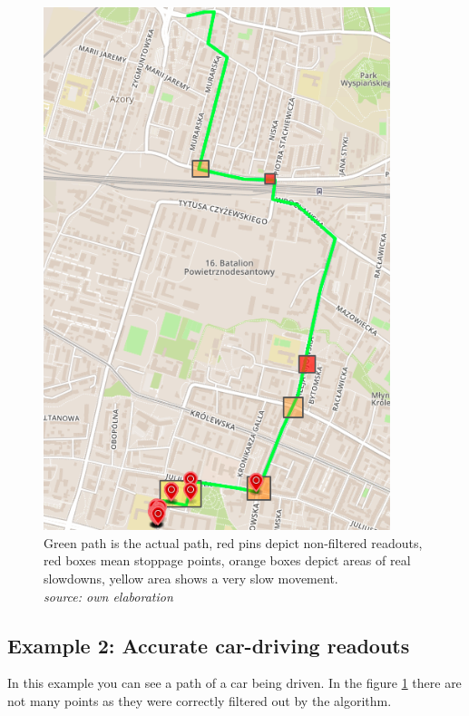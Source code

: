 \begin{figure}[]
    \includegraphics[width=0.9\textwidth]{images/2.png}
    \caption{Green path is the actual path, red pins depict non-filtered readouts, red boxes mean stoppage points, orange boxes depict areas of real slowdowns, yellow area shows a very slow movement. \\ \textit{source: own elaboration}}
    \label{fig:screenexample2}
\end{figure}

\subsection{Example 2: Accurate car-driving readouts}

In this example you can see a path of a car being driven. In the figure \ref{fig:screenexample2} there are not many points as they were correctly filtered out by the algorithm.

